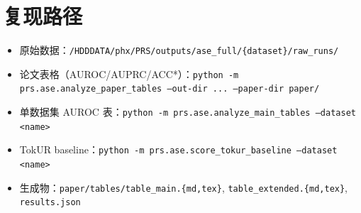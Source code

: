 \documentclass[11pt,a4paper]{article}
\begin{document}
\section{复现路径}

\begin{itemize}
  \item 原始数据：\texttt{/HDDDATA/phx/PRS/outputs/ase\_full/\{dataset\}/raw\_runs/}
  \item 论文表格（AUROC/AUPRC/ACC*）：\texttt{python -m prs.ase.analyze\_paper\_tables --out-dir ... --paper-dir paper/}
  \item 单数据集 AUROC 表：\texttt{python -m prs.ase.analyze\_main\_tables --dataset <name>}
  \item TokUR baseline：\texttt{python -m prs.ase.score\_tokur\_baseline --dataset <name>}
  \item 生成物：\texttt{paper/tables/table\_main.\{md,tex\}}, \texttt{table\_extended.\{md,tex\}}, \texttt{results.json}
\end{itemize}
\end{document}
